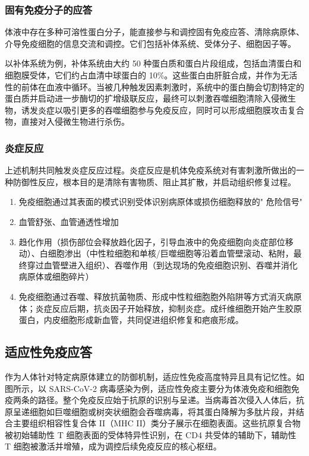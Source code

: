 \documentclass[9pt,a4paper,twoside]{rho-class/rho}
\begin{document}
    \subsubsection{固有免疫分子的应答}

    体液中存在多种可溶性蛋白分子，能直接参与和调控固有免疫应答、清除病原体、介导免疫细胞的信息交流和调控。它们包括补体系统、受体分子、细胞因子等。

    以补体系统为例，补体系统由大约 50 种蛋白质和蛋白片段组成，包括血清蛋白和细胞膜受体，它们约占血清中球蛋白的 10\%。这些蛋白由肝脏合成，并作为无活性的前体在血液中循环。当被几种触发因素刺激时，系统中的蛋白酶会切割特定的蛋白质并启动进一步酶切的扩增级联反应，最终可以刺激吞噬细胞清除入侵微生物，诱发炎症以吸引更多的吞噬细胞参与免疫反应，同时可以形成细胞膜攻击复合物，直接对入侵微生物进行杀伤。

    \subsubsection{炎症反应}

    上述机制共同触发炎症反应过程。炎症反应是机体免疫系统对有害刺激所做出的一种防御性反应，根本目的是清除有害物质、阻止其扩散，并启动组织修复过程。

    \begin{enumerate}
        \item 免疫细胞通过其表面的模式识别受体识别病原体或损伤细胞释放的" 危险信号"
        \item 血管舒张、血管通透性增加
        \item 趋化作用（损伤部位会释放趋化因子，引导血液中的免疫细胞向炎症部位移动）、白细胞渗出（中性粒细胞和单核/巨噬细胞等沿着血管壁滚动、粘附，最终穿过血管壁进入组织）、吞噬作用（到达现场的免疫细胞识别、吞噬并消化病原体或细胞碎片）
        \item 免疫细胞通过吞噬、释放抗菌物质、形成中性粒细胞胞外陷阱等方式消灭病原体；炎症反应后期，抗炎因子开始释放，抑制炎症。成纤维细胞开始产生胶原蛋白，内皮细胞形成新血管，共同促进组织修复和疤痕形成。
    \end{enumerate}

\subsection{适应性免疫应答}

    作为人体针对特定病原体建立的防御机制，适应性免疫高度特异且具有记忆性。如图所示，以 SARS-CoV-2 病毒感染为例，适应性免疫主要分为体液免疫和细胞免疫两条的路径。整个免疫反应始于抗原的识别与呈递。当病毒首次侵入人体后，抗原呈递细胞如巨噬细胞或树突状细胞会吞噬病毒，将其蛋白降解为多肽片段，并结合主要组织相容性复合体 II（MHC II）类分子展示在细胞表面。这些抗原复合物被初始辅助性 T 细胞表面的受体特异性识别，在 CD4 共受体的辅助下，辅助性 T 细胞被激活并增殖，成为调控后续免疫反应的核心枢纽。
\end{document}

